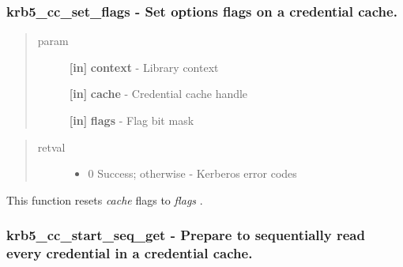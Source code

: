 \documentclass[letterpaper,10pt,english]{sphinxmanual}
\begin{document}
\subsubsection{krb5\_cc\_set\_flags -  Set options flags on a credential cache.}
\label{appdev/refs/api/krb5_cc_set_flags:krb5-cc-set-flags-set-options-flags-on-a-credential-cache}\label{appdev/refs/api/krb5_cc_set_flags::doc}

\begin{fulllineitems}
\label{appdev/refs/api/krb5_cc_set_flags:c.krb5_cc_set_flags}
\end{fulllineitems}

\begin{quote}\begin{description}
\item[{param}] \leavevmode
\textbf{{[}in{]}} \textbf{context} - Library context

\textbf{{[}in{]}} \textbf{cache} - Credential cache handle

\textbf{{[}in{]}} \textbf{flags} - Flag bit mask

\end{description}\end{quote}
\begin{quote}\begin{description}
\item[{retval}] \leavevmode\begin{itemize}
\item {} 
0   Success; otherwise - Kerberos error codes

\end{itemize}

\end{description}\end{quote}

This function resets \emph{cache} flags to \emph{flags} .


\subsubsection{krb5\_cc\_start\_seq\_get -  Prepare to sequentially read every credential in a credential cache.}
\label{appdev/refs/api/krb5_cc_start_seq_get::doc}\label{appdev/refs/api/krb5_cc_start_seq_get:krb5-cc-start-seq-get-prepare-to-sequentially-read-every-credential-in-a-credential-cache}
\end{document}
